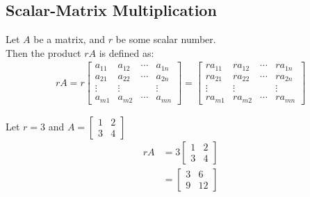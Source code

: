 \documentclass[../notes.tex]{subfiles}
\begin{document}
			\subsection{Scalar-Matrix Multiplication}
				Let $A$ be a matrix, and $r$ be some scalar number.\\
				Then the product $rA$ is defined as:
				\begin{align*}
					rA = r \begin{bmatrix}
						a_{11} & a_{12} & \cdots & a_{1n}\\
						a_{21} & a_{22} & \cdots & a_{2n}\\
						\vdots & \vdots & & \vdots\\
						a_{m1} & a_{m2} & \cdots & a_{mn}
					\end{bmatrix}
					= \begin{bmatrix}
						ra_{11} & ra_{12} & \cdots & ra_{1n}\\
						ra_{21} & ra_{22} & \cdots & ra_{2n}\\
						\vdots & \vdots & & \vdots\\
						ra_{m1} & ra_{m2} & \cdots & ra_{mn}
					\end{bmatrix}
				\end{align*}
				\begin{example}
					Let $r = 3$ and $A = \begin{bmatrix}
						1 & 2\\
						3 & 4
					\end{bmatrix}$
					\begin{align*}
						rA &= 3\begin{bmatrix}
							1 & 2\\
							3 & 4
						\end{bmatrix}\\
						&= \begin{bmatrix}
							3 & 6\\
							9 & 12
						\end{bmatrix}
					\end{align*}
				\end{example}
\end{document}
